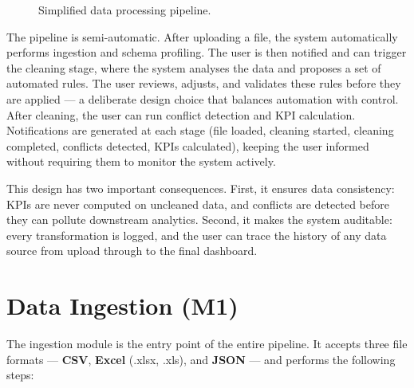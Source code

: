\begin{figure}[h!]
\centering
{}
\caption{Simplified data processing pipeline.}
\label{fig:pipeline}
\end{figure}

\noindent
The pipeline is semi-automatic.
After uploading a file, the system automatically
performs ingestion and schema profiling.
The user is then notified and can trigger
the cleaning stage, where the system analyses
the data and proposes a set of automated rules.
The user reviews, adjusts, and validates these rules
before they are applied — a deliberate design choice
that balances automation with control.
After cleaning, the user can run conflict detection
and KPI calculation.
Notifications are generated at each stage
(file loaded, cleaning started, cleaning completed,
conflicts detected, KPIs calculated),
keeping the user informed without requiring them
to monitor the system actively.

\vspace{0.4cm}
\noindent
This design has two important consequences.
First, it ensures data consistency:
KPIs are never computed on uncleaned data,
and conflicts are detected before they can
pollute downstream analytics.
Second, it makes the system auditable:
every transformation is logged, and the user
can trace the history of any data source
from upload through to the final dashboard.


\section{Data Ingestion (M1)}

\noindent
The ingestion module is the entry point
of the entire pipeline.
It accepts three file formats — \textbf{CSV},
\textbf{Excel} (.xlsx, .xls), and \textbf{JSON} —
and performs the following steps:

